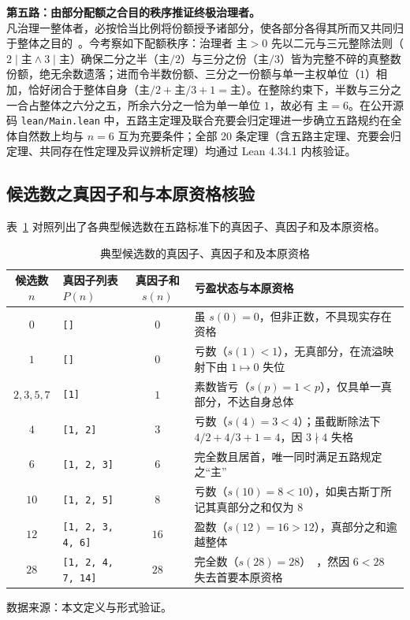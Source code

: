\documentclass[11pt,a4paper]{ctexart}
\begin{document}
\medskip
\noindent\textbf{第五路：由部分配额之合目的秩序推证终极治理者。}\\
凡治理一整体者，必按恰当比例将份额授予诸部分，使各部分各得其所而又共同归于整体之目的~\cite{aquinas,metaphysics}。今考察如下配额秩序：治理者 $\text{主} > 0$ 先以二元与三元整除法则（$2 \mid \text{主} \land 3 \mid \text{主}$）确保二分之半（$\text{主}/2$）与三分之份（$\text{主}/3$）皆为完整不碎的真整数份额，绝无余数遗落；进而令半数份额、三分之一份额与单一主权单位（$1$）相加，恰好闭合于整体自身（$\text{主}/2 + \text{主}/3 + 1 = \text{主}$）。在整除约束下，半数与三分之一合占整体之六分之五，所余六分之一恰为单一单位 $1$，故必有 $\text{主}=6$。在公开源码 \texttt{lean/Main.lean} 中，五路主定理及联合充要会归定理进一步确立五路规约在全体自然数上均与 $n=6$ 互为充要条件；全部 20 条定理（含五路主定理、充要会归定理、共同存在性定理及异议辨析定理）均通过 Lean 4.34.1 内核验证。

\subsection{候选数之真因子和与本原资格核验}

表~\ref{tab:candidates} 对照列出了各典型候选数在五路标准下的真因子、真因子和及本原资格。

\begin{table}[htbp]
  \centering
  \caption{典型候选数的真因子、真因子和及本原资格}
  \label{tab:candidates}
  \small
  \begin{tabularx}{\textwidth}{c >{\raggedright\arraybackslash}p{3.4cm} c >{\raggedright\arraybackslash}X}
    \toprule
    候选数 $n$ & 真因子列表 $P(n)$ & 真因子和 $s(n)$ & 亏盈状态与本原资格 \\
    \midrule
    $0$ & \texttt{[]} & $0$ & 虽 $s(0)=0$，但非正数，不具现实存在资格 \\
    $1$ & \texttt{[]} & $0$ & 亏数（$s(1)<1$），无真部分，在流溢映射下由 $1\mapsto 0$ 失位 \\
    $2, 3, 5, 7$ & \texttt{[1]} & $1$ & 素数皆亏（$s(p)=1<p$），仅具单一真部分，不达自身总体 \\
    $4$ & \texttt{[1, 2]} & $3$ & 亏数（$s(4)=3<4$）；虽截断除法下 $4/2+4/3+1=4$，因 $3\nmid 4$ 失格 \\
    $6$ & \texttt{[1, 2, 3]} & $6$ & 完全数且居首，唯一同时满足五路规定之``主'' \\
    $10$ & \texttt{[1, 2, 5]} & $8$ & 亏数（$s(10)=8<10$），如奥古斯丁所记其真部分之和仅为 $8$~\cite{augustine} \\
    $12$ & \texttt{[1, 2, 3, 4, 6]} & $16$ & 盈数（$s(12)=16>12$），真部分之和逾越整体~\cite{augustine} \\
    $28$ & \texttt{[1, 2, 4, 7, 14]} & $28$ & 完全数（$s(28)=28$）~\cite{euclid}，然因 $6<28$ 失去首要本原资格 \\
    \bottomrule
  \end{tabularx}
  \par\vspace{0.4em}
  {\footnotesize\raggedright 数据来源：本文定义与形式验证。\par}
\end{table}
\end{document}
